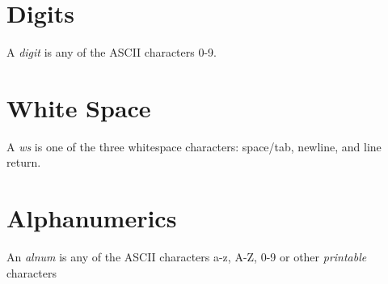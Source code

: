 \documentclass{memarticle}
\begin{document}
                \section{Digits}
                        A \emph{digit} is any of the ASCII characters 0-9.
                \section{White Space}
                        A \emph{ws} is one of the three whitespace characters: space/tab, newline, and line return. 
                \section{Alphanumerics}
                        An \emph{alnum} is any of the ASCII characters a-z, A-Z, 0-9 or other \emph{printable} characters
\printindex
\end{document}

